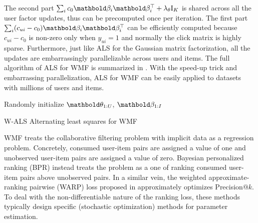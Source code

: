 The second part $\sum_i c_0 \mb\beta_i \mb\beta_i^\top + \lambda_\theta \mathrm{I}_K$ is shared across all the user factor updates, thus can be precomputed once per iteration. The first part $\sum_i (c_{ui} - c_0)\mb\beta_i\mb\beta_i^\top$ can be efficiently computed because $c_{ui} - c_0$ is non-zero only when $y_{ui} = 1$ and normally the click matrix is highly sparse. Furthermore, just like ALS for the Gaussian matrix factorization, all the updates are embarrassingly parallelizable across users and items. The full algorithm of ALS for \gls{WMF} is summarized in . With the speed-up trick and embarrassing parallelization, ALS for \gls{WMF} can be easily applied to datasets with millions of users and items. 

\begin{algorithm}
\DontPrintSemicolon %
Randomly initialize $\mb\theta_{1:U}$, $\mb\beta_{1:I}$\;
\;
\caption{{\sc W-ALS} Alternating least squares for \gls{WMF}}
\label{chpt:background:algo:wmf}
\end{algorithm}

\gls{WMF} treats the collaborative filtering problem with implicit data as a
regression problem. Concretely, consumed user-item pairs are assigned a
value of one and unobserved user-item pairs are assigned a value of zero.
Bayesian personalized ranking (BPR) \citep{rendle2009bpr,
rendle2014improving} instead treats the problem as a one of ranking
consumed user-item pairs above unobserved pairs.
In a similar vein, the weighted approximate-ranking pairwise (WARP) loss
proposed in \citet{weston2011wsabie} approximately optimizes Precision@$k$. 
To deal with the non-differentiable nature of the ranking
loss, these methods typically design specific (stochastic optimization)
methods for parameter estimation.

